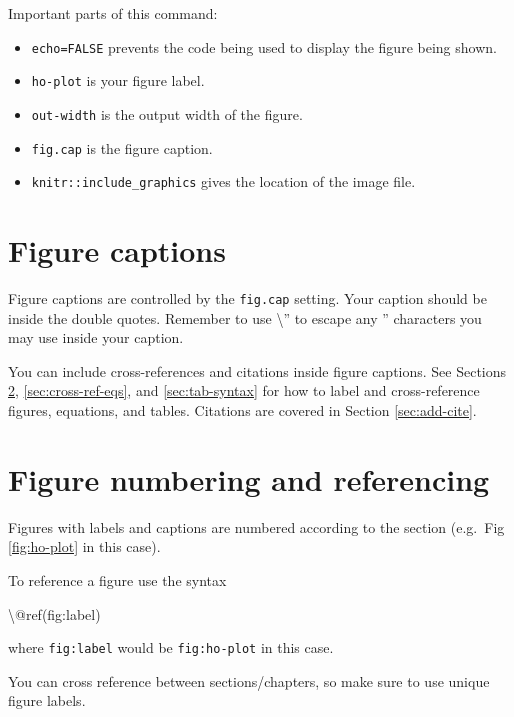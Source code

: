 \documentclass[
]{book}
\newenvironment{Shaded}{\begin{snugshade}}{\end{snugshade}}
\newcommand{\NormalTok}[1]{#1}
\providecommand{\tightlist}{%
  \setlength{\itemsep}{0pt}\setlength{\parskip}{0pt}}
\begin{document}
Important parts of this command:

\begin{itemize}
\tightlist
\item
  \texttt{echo=FALSE} prevents the code being used to display the figure being shown.
\item
  \texttt{ho-plot} is your figure label.
\item
  \texttt{out-width} is the output width of the figure.
\item
  \texttt{fig.cap} is the figure caption.
\item
  \texttt{knitr::include\_graphics} gives the location of the image file.
\end{itemize}

\section{Figure captions}\label{sec:fig-captions}

Figure captions are controlled by the \texttt{fig.cap} setting. Your caption should be inside the double quotes. Remember to use \textbackslash'' to escape any '' characters you may use inside your caption.

You can include cross-references and citations inside figure captions. See Sections \ref{sec:fig-nos}, \ref{sec:cross-ref-eqs}, and \ref{sec:tab-syntax} for how to label and cross-reference figures, equations, and tables. Citations are covered in Section \ref{sec:add-cite}.

\section{Figure numbering and referencing}\label{sec:fig-nos}

Figures with labels and captions are numbered according to the section (e.g.~Fig \ref{fig:ho-plot} in this case).

To reference a figure use the syntax

\begin{Shaded}
\begin{Highlighting}[]
\NormalTok{\textbackslash{}@ref(fig:label)}
\end{Highlighting}
\end{Shaded}

where \texttt{fig:label} would be \texttt{fig:ho-plot} in this case.

You can cross reference between sections/chapters, so make sure to use unique figure labels.
\end{document}

